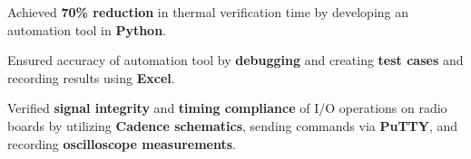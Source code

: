 \documentclass[A4,10pt]{article}
\newcommand{\resumeItem}[1]{
  \item\small{
    {#1 \vspace{-2pt}}
  }
}
\begin{document}
        \resumeItem{Achieved \textbf{70\% reduction} in thermal verification time by developing an automation tool in \textbf{Python}.} %
        \resumeItem{Ensured accuracy of automation tool by \textbf{debugging} and creating  \textbf{test cases} and recording results using \textbf{Excel}.}%

        \resumeItem{Verified \textbf{signal integrity} and \textbf{timing compliance} of I/O operations on radio boards by utilizing \textbf{Cadence schematics}, sending commands via \textbf{PuTTY}, and recording \textbf{oscilloscope measurements}.}
\end{document}
